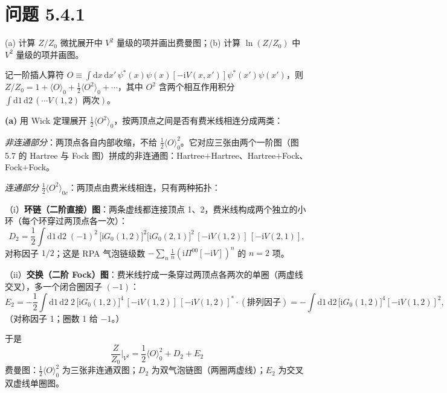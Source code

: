 \section*{问题 5.4.1}
\begin{problem}
(a) 计算 $Z/Z_0$ 微扰展开中 $V^{2}$ 量级的项并画出费曼图；(b) 计算 $\ln(Z/Z_0)$ 中 $V^{2}$ 量级的项并画图。
\end{problem}
\solution

记一阶插人算符 $O\equiv\int\mathrm{d}x\,\mathrm{d}x'\,\psi^{*}(x)\psi(x)[-\mathrm{i}V(x,x')]\psi^{*}(x')\psi(x')$，则 $Z/Z_0=1+\langle O\rangle_0+\frac{1}{2}\langle O^{2}\rangle_0+\cdots$，其中 $O^{2}$ 含两个相互作用积分 $\int\mathrm{d}1\,\mathrm{d}2\,(\cdots V(1,2)\text{ 两次})$。

\textbf{(a)} 用 Wick 定理展开 $\frac12\langle O^{2}\rangle_0$，按两顶点之间是否有费米线相连分成两类：

\emph{非连通部分}：两顶点各自内部收缩，不给 $\frac12\langle O\rangle_0^{2}$。它对应三张由两个一阶图（图 5.7 的 Hartree 与 Fock 图）拼成的非连通图：Hartree$+$Hartree、Hartree$+$Fock、Fock$+$Fock。

\emph{连通部分} $\frac12\langle O^{2}\rangle_{0c}$：两顶点由费米线相连，只有两种拓扑：

（i）\textbf{环链（二阶直接）图}：两条虚线都连接顶点 1、2，费米线构成两个独立的小环（每个环穿过两顶点各一次）：
\begin{equation*}
D_{2}=\frac{1}{2}\int\mathrm{d}1\,\mathrm{d}2\;(-1)^{2}\,
\big[\mathrm{i}G_0(1,2)\big]^{2}\big[\mathrm{i}G_0(2,1)\big]^{2}\,
[-\mathrm{i}V(1,2)]\,[-\mathrm{i}V(2,1)],
\end{equation*}
对称因子 $1/2$；这是 RPA 气泡链级数 $-\sum_n\frac1n(\mathrm{i}\Pi^{00}[-\mathrm{i}V])^{n}$ 的 $n=2$ 项。

（ii）\textbf{交换（二阶 Fock）图}：费米线拧成一条穿过两顶点各两次的单圈（两虚线交叉），多一个闭合圈因子 $(-1)$：
\begin{equation*}
E_{2}=-\frac{1}{2}\int\mathrm{d}1\,\mathrm{d}2\;2\,\big[\mathrm{i}G_0(1,2)\big]^{4}\,
[-\mathrm{i}V(1,2)]\,[-\mathrm{i}V(1,2)]^{*}\cdot(\text{排列因子})
=-\int\mathrm{d}1\,\mathrm{d}2\,\big[\mathrm{i}G_0(1,2)\big]^{4}[-\mathrm{i}V(1,2)]^{2},
\end{equation*}
（对称因子 1；圈数 1 给 $-1$。）

于是
\begin{equation*}
\boxed{\;
\frac{Z}{Z_0}\Big|_{V^{2}}=\frac{1}{2}\langle O\rangle_0^{2}+D_{2}+E_{2}\;}
\end{equation*}
费曼图：$\frac12\langle O\rangle_0^{2}$ 为三张非连通双图；$D_2$ 为双气泡链图（两圈两虚线）；$E_2$ 为交叉双虚线单圈图。

